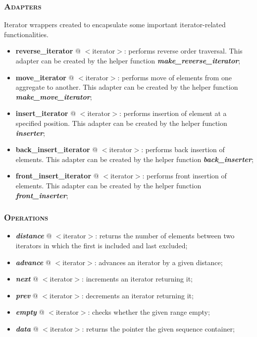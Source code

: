 \documentclass[10pt]{article}
\begin{document}
\begin{multicols*}{5}
{\subsubsection*{\textsc{Adapters}} 
\noindent
Iterator wrappers created to encapsulate some important iterator-related functionalities. 
\begin{itemize}[leftmargin=*,topsep=0.25pt]
  \setlength\itemsep{-1.8pt}
	\item \textbf{reverse\_iterator} @ $<$iterator$>$: performs reverse order traversal. This adapter can be created by the helper function \emph{\textbf{make\_reverse\_iterator}};
	\item \textbf{move\_iterator} @ $<$iterator$>$: performs move of elements from one aggregate to another. This adapter can be created by the helper function \emph{\textbf{make\_move\_iterator}};
	\item \textbf{insert\_iterator} @ $<$iterator$>$: performs insertion of element at a specified position. This adapter can be created by the helper function \emph{\textbf{inserter}};
	\item \textbf{back\_insert\_iterator} @ $<$iterator$>$: performs back insertion of elements. This adapter can be created by the helper function \emph{\textbf{back\_inserter}};
	\item \textbf{front\_insert\_iterator} @ $<$iterator$>$: performs front insertion of elements. This adapter can be created by the helper function \emph{\textbf{front\_inserter}};
\end{itemize}

\subsubsection*{\textsc{Operations}} 
\begin{itemize}[leftmargin=*,topsep=0.25pt]
  \setlength\itemsep{-1.8pt}
	\item  \emph{\textbf{distance}} @ $<$iterator$>$: returns the number of elements between two iterators in which the first is included and last excluded;
	\item  \emph{\textbf{advance}} @ $<$iterator$>$: advances an iterator by a given distance;
	\item  \emph{\textbf{next}} @ $<$iterator$>$: increments an iterator returning it;
	\item  \emph{\textbf{prev}} @ $<$iterator$>$: decrements an iterator returning it;
	\item  \emph{\textbf{empty}} @ $<$iterator$>$: checks whether the given range empty;
	\item  \emph{\textbf{data}} @ $<$iterator$>$: returns the pointer the given sequence container;
\end{itemize}

}
\end{multicols*}
\end{document}
